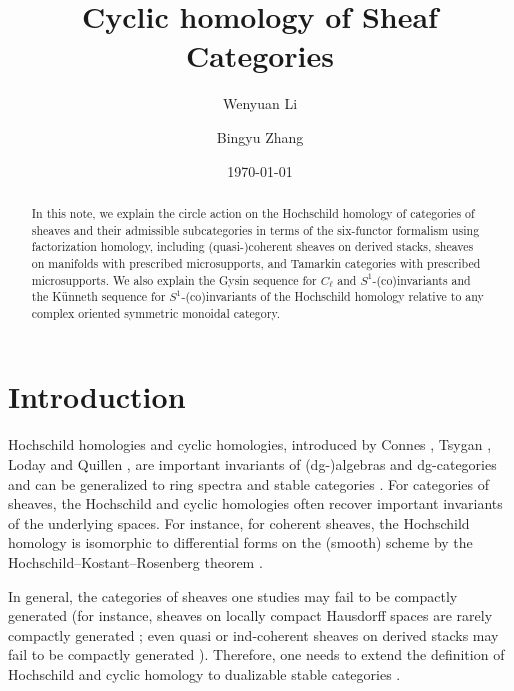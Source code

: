 \documentclass[11pt]{amsart}
\title{Cyclic homology of Sheaf Categories}
\author{Wenyuan Li}
\author{Bingyu Zhang}
\date{\today}
\numberwithin{equation}{section}
\theoremstyle{plain}
\theoremstyle{definition}
\theoremstyle{remark}
\begin{document}
\begin{abstract}   In this note, we explain the circle action on the Hochschild homology of categories of sheaves and their admissible subcategories in terms of the six-functor formalism using factorization homology, including (quasi-)coherent sheaves on derived stacks, sheaves on manifolds with prescribed microsupports, and Tamarkin categories with prescribed microsupports. We also explain the Gysin sequence for $C_\ell$ and $S^1$-(co)invariants and the K\"unneth sequence for $S^1$-(co)invariants of the Hochschild homology relative to any complex oriented symmetric monoidal category.
\end{abstract}
\maketitle

\section{Introduction}
Hochschild homologies and cyclic homologies, introduced by Connes \cite{Connes1983}, Tsygan \cite{Tsygan-homology-Lie-algebra}, Loday and Quillen \cite{Loday-Quillen-cyclic}, are important invariants of (dg-)algebras and dg-categories \cite{McCarthy,Keller-exact} and can be generalized to ring spectra and stable categories \cite{Bokstedt-Hsiang-Madsen,Nikolaus-Scholze-Ontopologicalcyclichomology,AMGR-FH-enriched}. For categories of sheaves, the Hochschild and cyclic homologies often recover important invariants of the underlying spaces. For instance, for coherent sheaves, the Hochschild homology is isomorphic to differential forms on the (smooth) scheme by the Hochschild--Kostant--Rosenberg theorem \cite{FeigenTsygan,LodayCyclic,Schuhmacher,Yekutieli,Ben-Zvi-Nadler-looplanglands,toen_vezzosi_2011}.

In general, the categories of sheaves one studies may fail to be compactly generated (for instance, sheaves on locally compact Hausdorff spaces are rarely compactly generated \cite{Neeman,Harr}; even quasi or ind-coherent sheaves on derived stacks may fail to be compactly generated \cite{Ben-Zvi-Francis-Nadler,Drinfeld-Gaitsgory,stefanich2025dualizability_deriveds_stack}). Therefore, one needs to extend the definition of Hochschild and cyclic homology to dualizable stable categories \cite{Hoyois-Scherotzke-Sibilla,Ayala-Francis-FH-dim1,Efimov-K-theory}.
\end{document}
